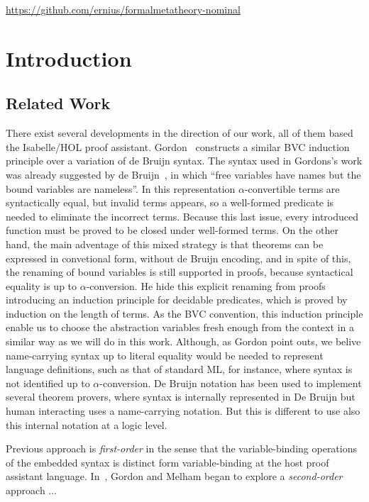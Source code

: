 \documentclass{entcs}
\newcommand{\alp}{\ensuremath{\alpha}}
\begin{document}
\begin{center}
  \href{https://github.com/ernius/formalmetatheory-nominal}{https://github.com/ernius/formalmetatheory-nominal}
\end{center}

\section{Introduction}
\label{sec:intro}

\subsection{Related Work}
\label{sec:relatedWork}

There exist several developments in the direction of our work, all of them based the Isabelle/HOL proof assistant. Gordon~\cite{gordon:mechanisation:1993} constructs a similar BVC induction principle over a variation of de Bruijn syntax. The syntax used in Gordons's work was already suggested by de Bruijn~\cite{deBruijn1972381}, in which ``free variables have names but the bound variables are nameless''. In this representation \alp-convertible terms are syntactically equal, but invalid terms appears, so a well-formed predicate is needed to eliminate the incorrect terms. Because this last issue, every introduced function must be proved to be closed under well-formed terms. On the other hand, the main adventage of this mixed strategy is that theorems can be expressed in convetional form, without de Bruijn encoding, and in spite of this, the renaming of bound variables is still supported in proofs, because syntactical equality is up to \alp-conversion. He hide this explicit renaming from proofs introducing an induction principle for decidable predicates, which is proved by induction on the length of terms. As the BVC convention, this induction principle enable us to choose the abstraction variables fresh enough from the context in a similar way as we will do in this work. Although, as Gordon point outs, we belive name-carrying syntax up to literal equality would be needed to represent language definitions, such as that of standard ML, for instance, where syntax is not identified up to \alp-conversion. De Bruijn notation has been used to implement several theorem provers, where syntax is internally represented in De Bruijn but human interacting uses a name-carrying notation. But this is different to use also this internal notation at a logic level. 

Previous approach is \emph{first-order} in the sense that the variable-binding operations of the embedded syntax is distinct form variable-binding at the host proof assistant language. In~\cite{DBLP:conf/tphol/GordonM96}, Gordon and Melham began to explore a \emph{second-order} approach ...
\end{document}
